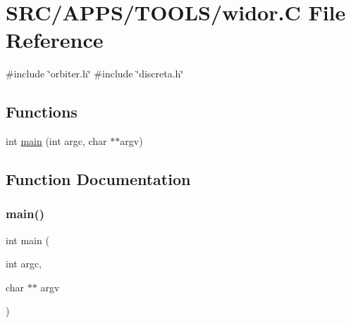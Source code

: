 \hypertarget{widor_8_c}{}\section{S\+R\+C/\+A\+P\+P\+S/\+T\+O\+O\+L\+S/widor.C File Reference}
\label{widor_8_c}
{\ttfamily \#include \char`\"{}orbiter.\+h\char`\"{}}\newline
{\ttfamily \#include \char`\"{}discreta.\+h\char`\"{}}\newline
\subsection*{Functions}
\begin{DoxyCompactItemize}
\item 
int \mbox{\hyperlink{widor_8_c_a3c04138a5bfe5d72780bb7e82a18e627}{main}} (int argc, char $\ast$$\ast$argv)
\end{DoxyCompactItemize}


\subsection{Function Documentation}
\mbox{\label{widor_8_c_a3c04138a5bfe5d72780bb7e82a18e627}} 
\subsubsection{\texorpdfstring{main()}{main()}}
{\footnotesize\ttfamily int main (\begin{DoxyParamCaption}\item[{int}]{argc,  }\item[{char $\ast$$\ast$}]{argv }\end{DoxyParamCaption})}

